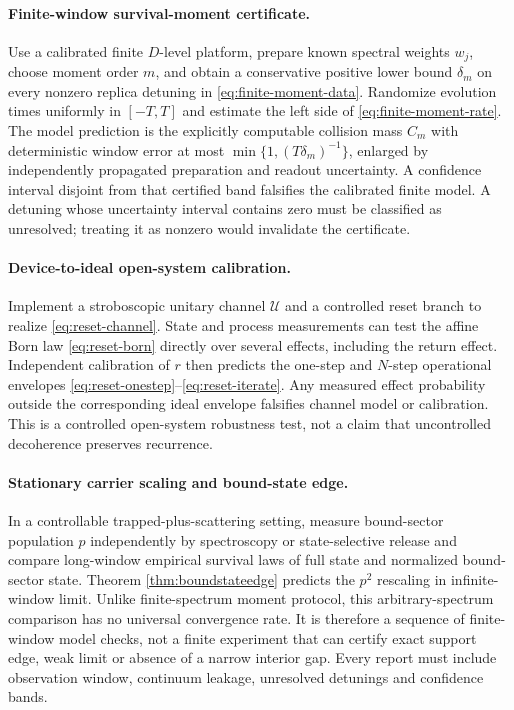 \paragraph{Finite-window survival-moment certificate.}
Use a calibrated finite $D$-level platform, prepare known spectral weights
$w_j$, choose moment order $m$, and obtain a conservative positive lower
bound $\delta_m$ on every nonzero replica detuning in
\eqref{eq:finite-moment-data}.  Randomize evolution times uniformly in
$[-T,T]$ and estimate the left side of \eqref{eq:finite-moment-rate}.
The model prediction is the explicitly computable collision mass $C_m$ with
deterministic window error at most
$\min\{1,(T\delta_m)^{-1}\}$, enlarged by independently propagated
preparation and readout uncertainty.  A confidence interval disjoint from
that certified band falsifies the calibrated finite model.  A detuning whose
uncertainty interval contains zero must be classified as unresolved; treating
it as nonzero would invalidate the certificate.

\paragraph{Device-to-ideal open-system calibration.}
Implement a stroboscopic unitary channel $\mathcal U$ and a controlled reset
branch to realize \eqref{eq:reset-channel}.  State and process measurements
can test the affine Born law \eqref{eq:reset-born} directly over several
effects, including the return effect.  Independent calibration of $r$ then
predicts the one-step and $N$-step operational envelopes
\eqref{eq:reset-onestep}--\eqref{eq:reset-iterate}.  Any measured effect
probability outside the corresponding ideal envelope falsifies channel model
or calibration.  This is a controlled open-system robustness test, not a
claim that uncontrolled decoherence preserves recurrence.

\paragraph{Stationary carrier scaling and bound-state edge.}
In a controllable trapped-plus-scattering setting, measure bound-sector
population $p$ independently by spectroscopy or state-selective release and
compare long-window empirical survival laws of full state and normalized
bound-sector state.  Theorem \ref{thm:boundstateedge} predicts the $p^2$
rescaling in infinite-window limit.  Unlike finite-spectrum moment protocol,
this arbitrary-spectrum comparison has no universal convergence rate.  It is
therefore a sequence of finite-window model checks, not a finite experiment
that can certify exact support edge, weak limit or absence of a narrow
interior gap.  Every report must include observation window, continuum
leakage, unresolved detunings and confidence bands.

